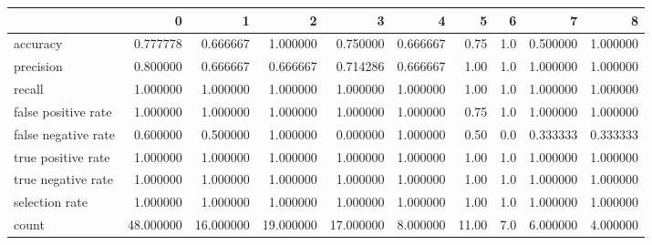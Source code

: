 \begin{tabular}{lrrrrrrrrr}
\toprule
{} &          0 &          1 &          2 &          3 &         4 &      5 &    6 &         7 &         8 \\
\midrule
accuracy            &   0.777778 &   0.666667 &   1.000000 &   0.750000 &  0.666667 &   0.75 &  1.0 &  0.500000 &  1.000000 \\
precision           &   0.800000 &   0.666667 &   0.666667 &   0.714286 &  0.666667 &   1.00 &  1.0 &  1.000000 &  1.000000 \\
recall              &   1.000000 &   1.000000 &   1.000000 &   1.000000 &  1.000000 &   1.00 &  1.0 &  1.000000 &  1.000000 \\
false positive rate &   1.000000 &   1.000000 &   1.000000 &   1.000000 &  1.000000 &   0.75 &  1.0 &  1.000000 &  1.000000 \\
false negative rate &   0.600000 &   0.500000 &   1.000000 &   0.000000 &  1.000000 &   0.50 &  0.0 &  0.333333 &  0.333333 \\
true positive rate  &   1.000000 &   1.000000 &   1.000000 &   1.000000 &  1.000000 &   1.00 &  1.0 &  1.000000 &  1.000000 \\
true negative rate  &   1.000000 &   1.000000 &   1.000000 &   1.000000 &  1.000000 &   1.00 &  1.0 &  1.000000 &  1.000000 \\
selection rate      &   1.000000 &   1.000000 &   1.000000 &   1.000000 &  1.000000 &   1.00 &  1.0 &  1.000000 &  1.000000 \\
count               &  48.000000 &  16.000000 &  19.000000 &  17.000000 &  8.000000 &  11.00 &  7.0 &  6.000000 &  4.000000 \\
\bottomrule
\end{tabular}
